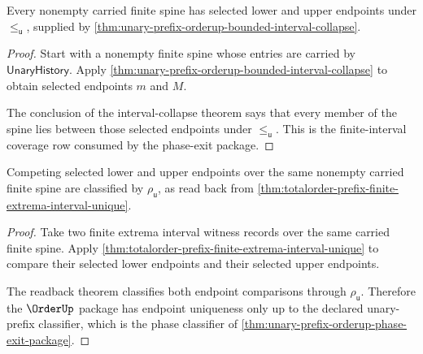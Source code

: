 \begin{theorem}
\label{thm:unary-prefix-orderup-finite-interval-coverage-obligation}
Every nonempty carried finite spine has selected lower and upper endpoints
under $\le_{\mathsf{u}}$, supplied by
\autoref{thm:unary-prefix-orderup-bounded-interval-collapse}.
\end{theorem}
\begin{proof}
Start with a nonempty finite spine whose entries are carried by
$\mathsf{UnaryHistory}$. Apply
\autoref{thm:unary-prefix-orderup-bounded-interval-collapse} to obtain selected
endpoints $m$ and $M$.

The conclusion of the interval-collapse theorem says that every member of the
spine lies between those selected endpoints under $\le_{\mathsf{u}}$. This is
the finite-interval coverage row consumed by the phase-exit package.
\end{proof}

\begin{theorem}
\label{thm:unary-prefix-orderup-endpoint-uniqueness-obligation}
Competing selected lower and upper endpoints over the same nonempty carried
finite spine are classified by $\rho_{\mathsf{u}}$, as read back from
\autoref{thm:totalorder-prefix-finite-extrema-interval-unique}.
\end{theorem}
\begin{proof}
Take two finite extrema interval witness records over the same carried finite
spine. Apply
\autoref{thm:totalorder-prefix-finite-extrema-interval-unique} to compare their
selected lower endpoints and their selected upper endpoints.

The readback theorem classifies both endpoint comparisons through
$\rho_{\mathsf{u}}$. Therefore the $\OrderUp$ package has endpoint uniqueness
only up to the declared unary-prefix classifier, which is the phase classifier
of \autoref{thm:unary-prefix-orderup-phase-exit-package}.
\end{proof}

